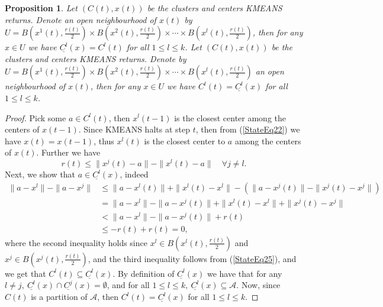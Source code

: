 \documentclass[11pt]{article}
\numberwithin{equation}{section}
\newtheorem{proposition}{Proposition}[section]
\begin{document}
\begin{proposition} \label{StateEq24}
Let $(C(t), x(t))$ be the clusters and centers KMEANS returns. Denote an open neighbourhood of $x(t)$ by $U = B\left( x^1(t),\frac{r(t)}{2}\right) \times  B\left( x^2(t),\frac{r(t)}{2}\right) \times \cdots \times B\left( x^l(t),\frac{r(t)}{2} \right)$, then for any $x \in U$ we have $\underline{C^l}(x)= C^l(t)$ for all $1 \leq l \leq k$.
Let $(C(t), x(t))$ be the clusters and centers KMEANS returns. Denote by $U = B\left( x^1(t),\frac{r(t)}{2}\right) \times  B\left( x^2(t),\frac{r(t)}{2}\right) \times \cdots \times B\left( x^l(t),\frac{r(t)}{2} \right)$ an open neighbourhood of $x(t)$, then for any $x \in U$ we have $C^l(t) = \underline{C^l}(x)$ for all $1 \leq l \leq k$.
\end{proposition}

\begin{proof}
Pick some $a \in C^l(t)$, then $x^l(t-1)$ is the closest center among the centers of $x(t-1)$. Since KMEANS halts at step $t$, then from (\ref{StateEq22}) we have $x(t)=x(t-1)$, thus $x^l(t)$ is the closest center to $a$ among the centers of $x(t)$. Further we have
\begin{equation}
	r(t) \leq \|x^j(t) - a\| - \|x^l(t) -a\| \quad \forall j \neq l . \label{StateEq25}
\end{equation}
Next, we show that $a \in \underline{C^l}(x)$, indeed
\begin{equation*}
\begin{aligned}
	\|a - x^l\| -  \|a - x^j\| &\leq \|a - x^l(t)\| + \|x^l(t) - x^l\| - \left( \|a - x^j(t)\| - \|x^j(t) - x^j\| \right) \\
	& = \|a - x^l\| - \|a - x^j(t)\| + \|x^l(t) - x^l\| + \|x^j(t) - x^j\| \\
	& < \|a - x^l\| - \|a - x^j(t)\| + r(t) \\
	& \leq -r(t) + r(t) = 0 ,
\end{aligned}
\end{equation*}
where the second inequality holds since $x^l \in B\left( x^l(t), \frac{r(t)}{2} \right)$ and $x^j \in B\left( x^j(t), \frac{r(t)}{2} \right)$, and the third inequality follows from (\ref{StateEq25}), and we get that $C^l(t) \subseteq \underline{C^l}(x)$. 
By definition of $\underline{C^l}(x)$ we have that for any $l \neq j, \: \underline{C^l}(x) \cap \underline{C^j}(x)=\emptyset$, and for all $1 \leq l \leq k, \: \underline{C^l}(x) \subseteq \mathcal{A}$. Now, since $C(t)$ is a partition of $\mathcal{A}$, then $C^l(t) = \underline{C^l}(x)$ for all $1 \leq l \leq k$.
\end{proof}
\end{document}
